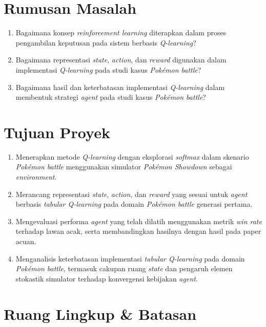 \documentclass[11pt,a4paper,oneside]{report}
\begin{document}
\section{Rumusan Masalah}

\begin{enumerate}[label=RM\arabic*.,leftmargin=*]
    \item Bagaimana konsep \textit{reinforcement learning} diterapkan dalam proses pengambilan keputusan pada sistem berbasis \textit{Q-learning}? 
    \item Bagaimana representasi \textit{state}, \textit{action}, dan \textit{reward} digunakan dalam implementasi \textit{Q-learning} pada studi kasus \textit{Pokémon battle}? 
    \item Bagaimana hasil dan keterbatasan implementasi \textit{Q-learning} dalam membentuk strategi \textit{agent} pada studi kasus \textit{Pokémon battle}? 
\end{enumerate}

\section{Tujuan Proyek}

\begin{enumerate}[label=T\arabic*.,leftmargin=*]
    \item Menerapkan metode \textit{Q-learning} dengan eksplorasi \textit{softmax} dalam skenario \textit{Pokémon battle} menggunakan simulator \textit{Pokémon Showdown} sebagai \textit{environment}.
    \item Merancang representasi \textit{state}, \textit{action}, dan \textit{reward} yang sesuai untuk \textit{agent} berbasis \textit{tabular Q-learning} pada domain \textit{Pokémon battle} generasi pertama. 
    \item Mengevaluasi performa \textit{agent} yang telah dilatih menggunakan metrik \textit{win rate} terhadap lawan acak, serta membandingkan hasilnya dengan hasil pada paper acuan. 
    \item Menganalisis keterbatasan implementasi \textit{tabular Q-learning} pada domain \textit{Pokémon battle}, termasuk cakupan ruang \textit{state} dan pengaruh elemen stokastik simulator terhadap konvergensi kebijakan \textit{agent}. 
\end{enumerate}
\section{Ruang Lingkup \& Batasan}
\end{document}
